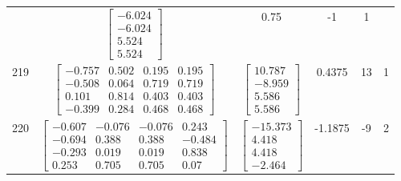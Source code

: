 \documentclass[a4paper,12pt]{article}
\begin{document}
\begin{tabular}{c c c c c c}
&
$\begin{bmatrix} -6.024 \\ -6.024 \\ 5.524 \\ 5.524 \end{bmatrix}$
&
0.75
&
-1
&
1
\\
219
&
$\begin{bmatrix} -0.757 & 0.502 & 0.195 & 0.195 \\ -0.508 & 0.064 & 0.719 & 0.719 \\ 0.101 & 0.814 & 0.403 & 0.403 \\ -0.399 & 0.284 & 0.468 & 0.468 \end{bmatrix}$
&
$\begin{bmatrix} 10.787 \\ -8.959 \\ 5.586 \\ 5.586 \end{bmatrix}$
&
0.4375
&
13
&
1
\\
220
&
$\begin{bmatrix} -0.607 & -0.076 & -0.076 & 0.243 \\ -0.694 & 0.388 & 0.388 & -0.484 \\ -0.293 & 0.019 & 0.019 & 0.838 \\ 0.253 & 0.705 & 0.705 & 0.07 \end{bmatrix}$
&
$\begin{bmatrix} -15.373 \\ 4.418 \\ 4.418 \\ -2.464 \end{bmatrix}$
&
-1.1875
&
-9
&
2
\\
\end{tabular} \egroup \newpage
\end{document}
